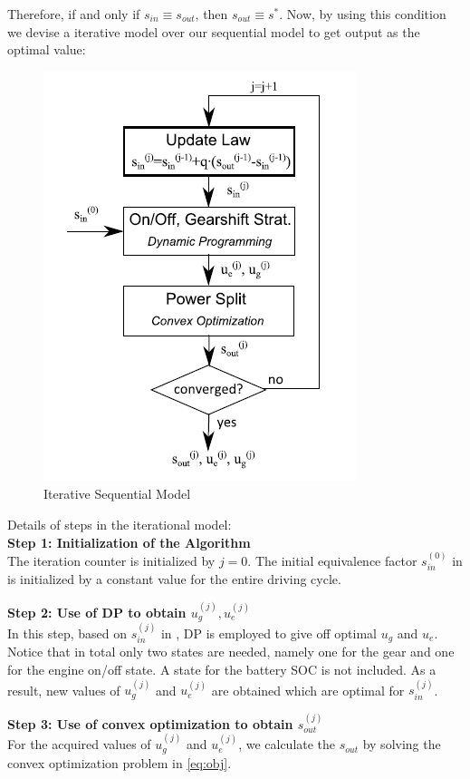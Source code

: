 \documentclass[conference]{IEEEtran}
\begin{document}
Therefore, if and only if $s_{in} \equiv s_{out}$, then $s_{out} \equiv s^*$. Now, by using this condition we devise a iterative model over our sequential model to get output as the optimal value:
\begin{figure}[h]
    \centering
    \includegraphics[scale = 0.5]{Iterative.png}
    \caption{Iterative Sequential Model}
    \label{fig:Iterseq}
\end{figure}

Details of steps in the iterational model:\\
\textbf{Step 1: Initialization of the Algorithm}\\
The iteration counter is initialized by $j = 0$. The initial equivalence factor $s_{in}^{(0)}$
in is initialized by a constant value for the entire driving cycle.


\noindent\textbf{Step 2: Use of DP to obtain $u_g^{(j)}, u_e^{(j)}$}\\
In this step, based on $s_{in}^{(j)}$ in , DP is employed to give off optimal $u_g$ and $u_e$. Notice that in total only two states are needed, namely one for the gear and one for the engine on/off state. A state for the battery SOC is not included. As a result, new values of $u_g^{(j)}$ and $u_e^{(j)}$ are obtained which are optimal for $s_{in}^{(j)}$.

\noindent\textbf{Step 3: Use of convex optimization to obtain $s_{out}^{(j)}$}\\
For the acquired values of $u_g^{(j)}$ and $u_e^{(j)}$, we calculate the $s_{out}$ by solving the convex optimization problem in \ref{eq:obj}.
\end{document}
